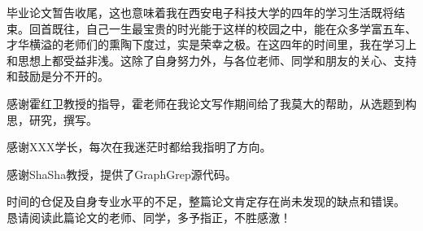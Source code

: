 \documentclass{XDBAthesis}
\begin{document}
\else
\fi

\begin{thanks}

毕业论文暂告收尾，这也意味着我在西安电子科技大学的四年的学习生活既将结束。回首既往，自己一生最宝贵的时光能于这样的校园之中，能在众多学富五车、才华横溢的老师们的熏陶下度过，实是荣幸之极。在这四年的时间里，我在学习上和思想上都受益非浅。这除了自身努力外，与各位老师、同学和朋友的关心、支持和鼓励是分不开的。

感谢霍红卫教授的指导，霍老师在我论文写作期间给了我莫大的帮助，从选题到构思，研究，撰写。

感谢XXX学长，每次在我迷茫时都给我指明了方向。

感谢ShaSha教授，提供了GraphGrep源代码。

时间的仓促及自身专业水平的不足，整篇论文肯定存在尚未发现的缺点和错误。
恳请阅读此篇论文的老师、同学，多予指正，不胜感激！


\end{thanks}

\ifx\allfiles\undefined
%

\end{document}
